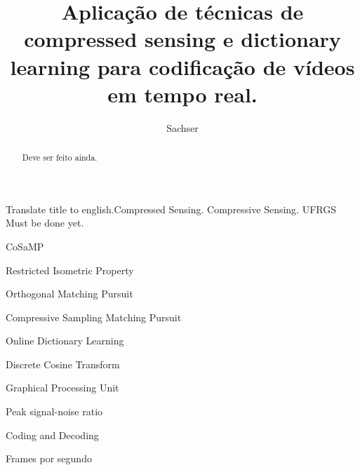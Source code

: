 \documentclass[cic,tc]{iiufrgs}
\title{Aplicação de técnicas de compressed sensing e dictionary learning para codificação de vídeos em tempo real.}
\author{Sachser}{Eduardo}
\begin{document}
\maketitle





\begin{abstract}
    Deve ser feito ainda.
\end{abstract}

\begin{englishabstract}{Translate title to english.}{Compressed Sensing. Compressive Sensing. UFRGS}
    Must be done yet.
\end{englishabstract}

\listoffigures

\listoftables

\begin{listofabbrv}{CoSaMP}
    \item[RIP] Restricted Isometric Property
    \item[OMP] Orthogonal Matching Pursuit
    \item[CoSaMP] Compressive Sampling Matching Pursuit 
    \item[ODL] Online Dictionary Learning 
    \item[DCT] Discrete Cosine Transform 
    \item[GPU] Graphical Processing Unit
    \item[PSNR] Peak signal-noise ratio 
    \item[CoDec] Coding and Decoding  
    \item[FPS] Frames por segundo
\end{listofabbrv}
\end{document}
